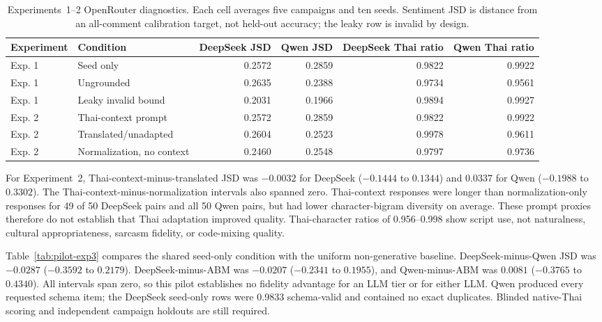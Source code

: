 \documentclass[conference]{IEEEtran}
\begin{document}
\begin{table}[t]
\caption{Experiments~1--2 OpenRouter diagnostics. Each cell averages five
campaigns and ten seeds. Sentiment JSD is distance from an all-comment
calibration target, not held-out accuracy; the leaky row is invalid by design.}
\label{tab:pilot-exp12}
\centering
\footnotesize
\begin{tabular}{@{}llrrrr@{}}
\toprule
Experiment & Condition & DeepSeek JSD & Qwen JSD & DeepSeek Thai ratio & Qwen Thai ratio \\
\midrule
Exp. 1 & Seed only & 0.2572 & 0.2859 & 0.9822 & 0.9922 \\
Exp. 1 & Ungrounded & 0.2635 & 0.2388 & 0.9734 & 0.9561 \\
Exp. 1 & Leaky invalid bound & 0.2031 & 0.1966 & 0.9894 & 0.9927 \\
Exp. 2 & Thai-context prompt & 0.2572 & 0.2859 & 0.9822 & 0.9922 \\
Exp. 2 & Translated/unadapted & 0.2604 & 0.2523 & 0.9978 & 0.9611 \\
Exp. 2 & Normalization, no context & 0.2460 & 0.2548 & 0.9797 & 0.9736 \\
\bottomrule
\end{tabular}
\end{table}

For Experiment~2, Thai-context-minus-translated JSD was $-0.0032$ for
DeepSeek ($-0.1444$ to $0.1344$) and $0.0337$ for Qwen ($-0.1988$ to $0.3302$).
The Thai-context-minus-normalization intervals also spanned zero. Thai-context
responses were longer than normalization-only responses for 49 of 50 DeepSeek
pairs and all 50 Qwen pairs, but had lower character-bigram diversity on
average. These prompt proxies therefore do not establish that Thai adaptation
improved quality. Thai-character ratios of 0.956--0.998 show script use, not
naturalness, cultural appropriateness, sarcasm fidelity, or code-mixing quality.

Table~\ref{tab:pilot-exp3} compares the shared seed-only condition with the
uniform non-generative baseline. DeepSeek-minus-Qwen JSD was $-0.0287$
($-0.3592$ to $0.2179$). DeepSeek-minus-ABM was $-0.0207$ ($-0.2341$ to
$0.1955$), and Qwen-minus-ABM was $0.0081$ ($-0.3765$ to $0.4340$). All
intervals span zero, so this pilot establishes no fidelity advantage for an
LLM tier or for either LLM. Qwen produced every requested schema item; the
DeepSeek seed-only rows were 0.9833 schema-valid and contained no exact
duplicates. Blinded native-Thai scoring and independent campaign holdouts are
still required.
\end{document}
